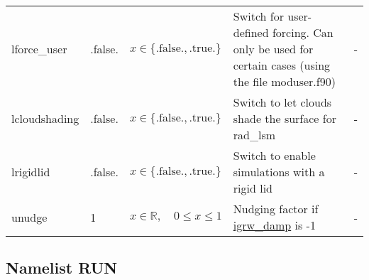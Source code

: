 \documentclass[twoside,11pt,fleqn,a4paper,english,openright]{report}
\begin{document}
\begin{center}
\begin{supertabular}{|l|p{1.6cm}|p{4cm}|p{6cm}|l|}
  lforce\_user	& .false. & $x\in\{\text{.false.},\text{.true.}\}$ & Switch for user-defined forcing. Can only be used for certain cases (using the file moduser.f90) & -\\
  lcloudshading	& .false. & $x\in\{\text{.false.},\text{.true.}\}$ & Switch to let clouds shade the surface for rad\_lsm & -\\
  lrigidlid	& .false. & $x\in\{\text{.false.},\text{.true.}\}$ & Switch to enable simulations with a rigid lid & -\\
  unudge	& 1		& $x \in \mathbb{R}, \quad 0 \leq x \leq 1$	& Nudging factor if \hyperlink{igrw}{igrw\_damp} is -1 & -\\
\end{supertabular}
\end{center}

\subsection{Namelist RUN}\label{par:run}
\end{document}
